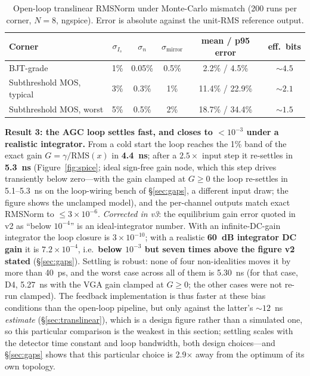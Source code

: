 \documentclass[11pt]{article}
\begin{document}
\begin{table}[h]
\centering
\caption{Open-loop translinear RMSNorm under Monte-Carlo mismatch (200 runs per corner, $N=8$, ngspice). Error is absolute against the unit-RMS reference output.}
\label{tab:mismatch}
\small
\begin{tabular}{lccccc}
\toprule
Corner & $\sigma_{I_s}$ & $\sigma_n$ & $\sigma_{\text{mirror}}$ & mean / p95 error & eff.\ bits \\
\midrule
BJT-grade & 1\% & 0.05\% & 0.5\% & 2.2\% / 4.5\% & ${\sim}4.5$ \\
Subthreshold MOS, typical & 3\% & 0.3\% & 1\% & 11.4\% / 22.9\% & ${\sim}2.1$ \\
Subthreshold MOS, worst & 5\% & 0.5\% & 2\% & 18.7\% / 34.4\% & ${\sim}1.5$ \\
\bottomrule
\end{tabular}
\end{table}

\textbf{Result 3: the AGC loop settles fast, and closes to $<10^{-3}$ under a realistic integrator.} From a cold start the loop reaches the 1\% band of the exact gain $G = \gamma/\text{RMS}(x)$ in \textbf{4.4~ns}; after a $2.5\times$ input step it re-settles in \textbf{5.3~ns} (Figure~\ref{fig:spice}; ideal sign-free gain node, which this step drives transiently below zero---with the gain clamped at $G \ge 0$ the loop re-settles in 5.1--5.3~ns on the loop-wiring bench of \S\ref{sec:gaps}, a different input draw; the figure shows the unclamped model), and the per-channel outputs match exact RMSNorm to $\leq\!3\times10^{-6}$. \textit{Corrected in v3}: the equilibrium gain error quoted in v2 as ``below $10^{-4}$'' is an ideal-integrator number. With an infinite-DC-gain integrator the loop closure is $3\times10^{-10}$; with a realistic \textbf{60~dB integrator DC gain} it is $7.2\times10^{-4}$, i.e.\ \textbf{below $10^{-3}$ but seven times above the figure v2 stated} (\S\ref{sec:gaps}). Settling is robust: none of four non-idealities moves it by more than 40~ps, and the worst case across all of them is 5.30~ns (for that case, D4, 5.27~ns with the VGA gain clamped at $G \ge 0$; the other cases were not re-run clamped). The feedback implementation is thus faster at these bias conditions than the open-loop pipeline, but only against the latter's ${\sim}12$~ns \textit{estimate} (\S\ref{sec:translinear}), which is a design figure rather than a simulated one, so this particular comparison is the weakest in this section; settling scales with the detector time constant and loop bandwidth, both design choices---and \S\ref{sec:gaps} shows that this particular choice is 2.9$\times$ away from the optimum of its own topology.
\end{document}
